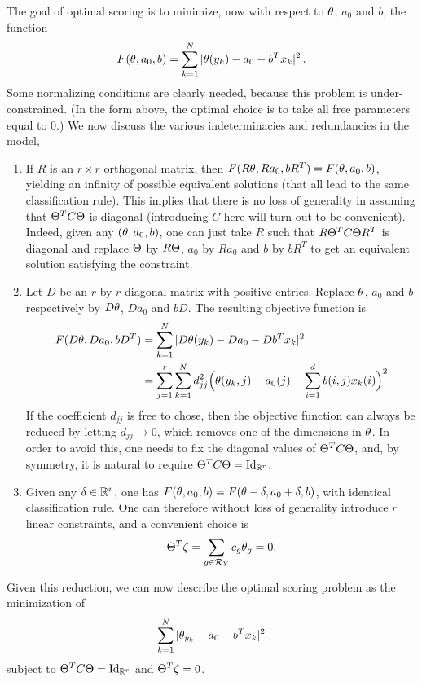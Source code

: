 The goal of optimal scoring is to minimize, now with respect to $\theta$, ${a_0}$ and $b$, the function
\[
F(\theta, {a_0}, b) = \sum_{k=1}^N |\theta(y_k) - {a_0} - b^T  x_k|^2\,.
\]
Some normalizing conditions are clearly needed, because this problem is under-constrained. (In the  form above, the optimal choice is to take all free parameters equal to 0.) We now discuss the various indeterminacies and redundancies in the model, 

\begin{enumerate}[label = (\alph*), wide=0cm]
\item If $R$ is an $r\times r$ orthogonal matrix, then $F(R\theta, R{a_0}, bR^T) = F(\theta, {a_0}, b)$, yielding an infinity of possible equivalent solutions (that all lead to the same classification rule).
This implies that there is no loss of generality in assuming that $\Theta^T C \Theta$ is diagonal (introducing $C$ here will turn out to be convenient). Indeed, given any $(\theta, {a_0}, b)$, one can just take $R$ such that $R\Theta^T C \Theta R^T$ is diagonal and replace $\Theta$ by $R\Theta$, ${a_0}$ by $R{a_0}$ and $b$ by $bR^T$ to get an equivalent solution satisfying the constraint.
\item Let $D$ be an $r$ by $r$ diagonal matrix with positive entries. Replace $\theta$, ${a_0}$ and $b$ respectively by $D\theta$, $D{a_0}$ and $bD$. The resulting objective function is 
\[
\begin{aligned}
F(D\theta, D{a_0}, bD^T) &= \sum_{k=1}^N |D\theta(y_k) - D{a_0} - Db^T  x_k|^2 \\
&= \sum_{j=1}^r \sum_{k=1}^N d_{jj}^2 \Big(\theta(y_k, j) - {a_0}(j) - \sum_{i=1}^d b(i,j)  x_k(i)\Big)^2
\end{aligned}
\]
If the coefficient $d_{jj}$ is free to chose, then the objective function can always be reduced by letting $d_{jj} \to 0$, which removes one of the dimensions in $\theta$. In order to avoid this, one needs to  fix the diagonal values of  $\Theta^T C\Theta$, and, by symmetry, it is natural to require  $\Th^T C\Th = \Id[r]$. 
\item Given any $\delta\in {\mathbb{R}}^r$, one has $F(\theta, {a_0}, b) = F(\theta-\delta, {a_0}+\delta, b)$, with identical classification rule.
One can therefore without loss of generality introduce $r$ linear constraints, and a convenient choice is 
\[
\Theta^T\zeta = \sum_{g\in {\mathcal R}_Y} c_g\theta_g= 0.
\]
\end{enumerate}
\medskip

Given this reduction, we can now describe the optimal scoring problem as the minimization of 
\[
\sum_{k=1}^N |\theta_{y_k} - {a_0} - b^T x_k|^2
\]
subject to $\Th^TC\Th = \Id[r]$ and $\Theta^T\zeta = 0$. 

